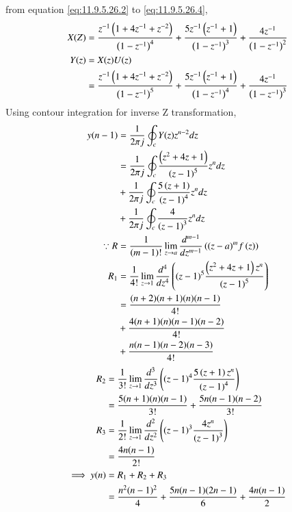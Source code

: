 \documentclass[journal,12pt,twocolumn]{IEEEtran}
\theoremstyle{remark}
\begin{document}
from equation \eqref{eq:11.9.5.26.2} to \eqref{eq:11.9.5.26.4},\\
    \begin{align}
        X(Z) &= \frac{z^{-1}\left(1+4z^{-1}+z^{-2}\right)}{\left(1-z^{-1}\right)^4} + \frac{5z^{-1}\left(z^{-1}+1\right)}{\left(1-z^{-1}\right)^3} + \frac{4z^{-1}}{\left(1-z^{-1}\right)^2} \\
        Y(z) &= X(z)U(z)\\
        &= \frac{z^{-1}\left(1+4z^{-1}+z^{-2}\right)}{\left(1-z^{-1}\right)^5} + \frac{5z^{-1}\left(z^{-1}+1\right)}{\left(1-z^{-1}\right)^4} + \frac{4z^{-1}}{\left(1-z^{-1}\right)^3} 
    \end{align}
Using contour integration for inverse Z transformation,
    \begin{align}
        y(n-1) &= \frac{1}{2\pi j}\oint_c Y(z) z^{n-2} dz \\
        &= \frac{1}{2\pi j}\oint_c \frac{\left(z^2+4z+1\right)}{\left(z-1\right)^5} z^{n} dz \nonumber\\
        & + \frac{1}{2\pi j}\oint_c \frac{5\left(z+1\right)}{\left(z-1\right)^4} z^{n} dz \nonumber\\
        & + \frac{1}{2\pi j}\oint_c \frac{4}{\left(z-1\right)^3} z^{n} dz \\
        \because R&=\frac{1}{\left(m-1\right)!}\lim\limits_{z\to a}\frac{d^{m-1}}{dz^{m-1}}\left({(z-a)}^{m}f\left(z\right)\right)\\
        R_1 &=\frac{1}{4!}\lim\limits_{z\to 1}\frac{d^4}{dz^4}\left((z-1)^5 \frac{\left(z^2+4z+1\right)z^n}{\left(z-1\right)^5}\right)\\
        &= \frac{(n+2)(n+1)(n)(n-1)}{4!} \nonumber\\
        &+ \frac{4(n+1)(n)(n-1)(n-2)}{4!} \nonumber\\
        &+ \frac{n(n-1)(n-2)(n-3)}{4!}
    \end{align}
    \begin{align}
        R_2 &=\frac{1}{3!}\lim\limits_{z\to 1}\frac{d^3}{dz^3} \left((z-1)^4 \frac{5\left(z+1\right)z^n}{\left(z-1\right)^4}\right)\\
        &= \frac{5(n+1)(n)(n-1)}{3!} + \frac{5n(n-1)(n-2)}{3!}\\
        R_3 &=\frac{1}{2!}\lim\limits_{z\to 1}\frac{d^2}{dz^2} \left((z-1)^3 \frac{4z^n}{\left(z-1\right)^3}\right)\\
        &= \frac{4n(n-1)}{2!}\\
        \implies y(n) &= R_1 + R_2 + R_3 \\
        &= \frac{n^2(n-1)^2}{4} + \frac{5n(n-1)(2n-1)}{6} + \frac{4n(n-1)}{2}
    \end{align}
\end{document}
